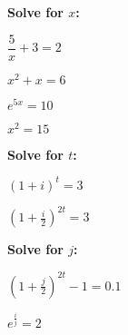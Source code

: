 \documentclass[addpoints]{exam}
\begin{document}
\textbf{Solve for $x$:}
\vspace{.2in}

\begin{questions}

    \question $\dfrac{5}{x} + 3 = 2$
    \vspace{1.5in}

    \question $x^2 + x = 6$
    \vspace{1.5in}

    \question $e^{5x} = 10$
    \vspace{1.5in}

    \question $x^2 = 15$
    \vspace{1.25in}

    \pagebreak
    \textbf{Solve for $t$:}
    \vspace{.2in}


    \question $(1+i)^t = 3$
    \vspace{1.5in}

    \question $(1+\frac{i}{2})^{2t} = 3$
    \vspace{1.5in}

    \textbf{Solve for $j$:}
    \vspace{.2in}

    \question $(1+\frac{j}{2})^{2t} - 1 = 0.1$
    \vspace{1.5in}

    \question $e^{\frac{i}{j}} = 2$

\end{questions}
\end{document}

